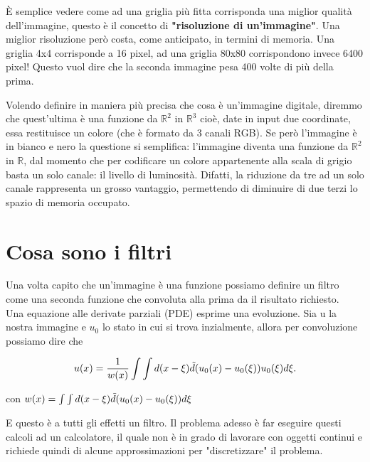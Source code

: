 \noindent
\`E semplice vedere come ad una griglia più fitta corrisponda una miglior qualità dell'immagine, questo è il concetto di \textbf{"risoluzione di un'immagine"}. 
Una miglior risoluzione però costa, come anticipato, in termini di memoria. Una griglia 4x4 corrisponde a 16 pixel, ad una griglia 80x80 corrispondono invece 6400 pixel! Questo vuol dire che la seconda immagine pesa 400 volte di più della prima.

\vspace{1em} \noindent
Volendo definire in maniera più precisa che cosa è un'immagine digitale, diremmo che quest'ultima è una funzione da $\mathbb R^2$ in $\mathbb R^3$ cioè, date in input due coordinate, essa restituisce un colore (che è formato da 3 canali RGB). Se però l'immagine è in bianco e nero la questione si semplifica: l'immagine diventa una funzione da $\mathbb R^2$ in $\mathbb R$, dal momento che per codificare un colore appartenente alla scala di grigio basta un solo canale: il livello di luminosità. Difatti, la riduzione da tre ad un solo canale rappresenta un grosso vantaggio, permettendo di diminuire di due terzi lo spazio di memoria occupato.

\section{Cosa sono i filtri}
Una volta capito che un'immagine è una funzione possiamo definire un filtro come una seconda funzione che convoluta alla prima da il risultato richiesto.\\
Una equazione alle derivate parziali (PDE) esprime una evoluzione. Sia u la nostra immagine e $u_0$ lo stato in cui si trova inzialmente, allora per convoluzione possiamo dire che 

\begin{equation} \label{eq:eq3}
u(x)=\frac{1}{w(x)}\int\int d(x-\xi)\Tilde{d}(u_0(x) -u_0(\xi))u_0(\xi)d\xi.
\end{equation}

\centering con  $w(x) = \int\int d(x-\xi)\Tilde{d}(u_0(x) -u_0(\xi))d\xi$\newline

\raggedright

E questo è a tutti gli effetti un filtro. Il problema adesso è far eseguire questi calcoli ad un calcolatore, il quale non è in grado di lavorare con oggetti continui e richiede quindi di alcune approssimazioni per "discretizzare" il problema.



